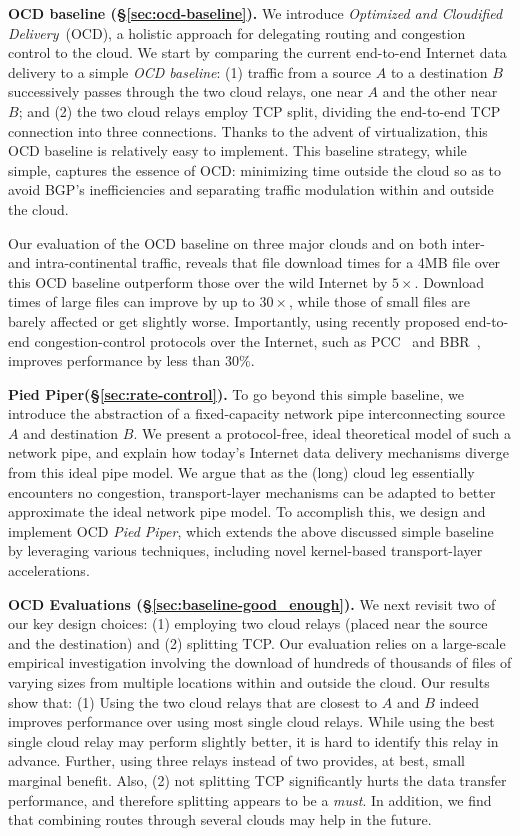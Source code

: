 \documentclass[newfonts=false,format=sigconf,anonymous,10pt,letterpaper]{acmart}
\newcommand{\T}[1]{\smallskip\noindent\textbf{#1}} %
\newcommand{\name}{Pied Piper\xspace}
\begin{document}
\T{OCD baseline (\S\ref{sec:ocd-baseline}).} We introduce \textit{Optimized and Cloudified Delivery}~(OCD), a holistic approach for delegating routing and congestion control to the cloud. We start by comparing the current end-to-end Internet data delivery to a simple \textit{OCD baseline}: (1) traffic from a source $A$ to a destination $B$ successively passes through the two cloud relays, one near $A$ and the other near $B$; and (2) the two cloud relays employ TCP split, dividing the end-to-end TCP connection into three connections. Thanks to the advent of virtualization, this OCD baseline is relatively easy to implement. This baseline strategy, while simple, captures the essence of OCD: minimizing time outside the cloud so as to avoid BGP's inefficiencies and separating traffic modulation within and outside the cloud.

Our evaluation of the OCD baseline on three major clouds and on both inter- and intra-continental traffic, reveals that file download times for a 4MB file over this OCD baseline outperform those over the wild Internet by $5\times$. Download times of large files can improve by up to $30\times$, while those of small files are barely affected or get slightly worse. Importantly, using recently proposed end-to-end congestion-control protocols over the Internet, such as PCC~\cite{PCC} and BBR~\cite{BBR}, improves performance by less than $30\%$.

\T{\name (\S\ref{sec:rate-control}).} To go beyond this simple baseline, we introduce the abstraction of a fixed-capacity network pipe interconnecting source $A$ and destination $B$. We present a protocol-free, ideal theoretical model of such a network pipe, and explain how today's Internet data delivery mechanisms diverge from this ideal pipe model. We argue that as the (long) cloud leg essentially encounters no congestion, transport-layer mechanisms can be adapted to better approximate the ideal network pipe model. To accomplish this, we design and implement OCD \textit{\name}, which extends the above discussed simple baseline by leveraging various techniques, including novel kernel-based transport-layer accelerations. 

\T{OCD Evaluations (\S\ref{sec:baseline-good_enough}).} We next revisit two of our key design choices: (1) employing two cloud relays (placed near the source and the destination) and (2) splitting TCP. Our evaluation relies on a large-scale empirical
investigation involving the download of hundreds of thousands of files of
varying sizes from multiple locations within and outside the cloud. Our results
show that: (1) Using the two cloud relays that are closest to $A$ and $B$ indeed improves performance over using most single cloud relays. While using the best single cloud relay may perform slightly better, it is hard to identify this relay in advance. Further, using three relays instead of two provides, at best, small marginal benefit. Also, (2) not splitting TCP significantly hurts the data transfer performance, and therefore splitting appears to be a \textit{must}. In addition, we find that combining routes through several clouds may help in the future.
\end{document}
